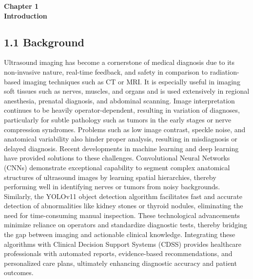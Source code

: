 \documentclass[12pt]{article}
\begin{document}
\vspace*{\fill}
\begin{center}
    {\Large \bfseries Chapter 1} \\[1em]
    {\Large \bfseries Introduction}
\end{center}
\vspace*{\fill}
\newpage %



\subsection{1.1 Background}

\vspace{10pt}

  \noindent Ultrasound imaging has become a cornerstone of medical diagnosis due to its non-invasive nature,
real-time feedback, and safety in comparison to radiation-based imaging techniques such as CT or
MRI. It is especially useful in imaging soft tissues such as nerves, muscles, and organs and is used
extensively in regional anesthesia, prenatal diagnosis, and abdominal scanning. Image interpretation continues to be heavily operator-dependent, resulting in variation of diagnoses, particularly
for subtle pathology such as tumors in the early stages or nerve compression syndromes. Problems
such as low image contrast, speckle noise, and anatomical variability also hinder proper analysis,
resulting in misdiagnosis or delayed diagnosis. Recent developments in machine learning and deep
learning have provided solutions to these challenges.
Convolutional Neural Networks (CNNs) demonstrate exceptional capability to segment complex anatomical structures of ultrasound images by learning spatial hierarchies, thereby performing well in identifying nerves or tumors from noisy backgrounds. Similarly, the YOLOv11 object
detection algorithm facilitates fast and accurate detection of abnormalities like kidney stones or
thyroid nodules, eliminating the need for time-consuming manual inspection. These technological
advancements minimize reliance on operators and standardize diagnostic tests, thereby bridging
the gap between imaging and actionable clinical knowledge. Integrating these algorithms with
Clinical Decision Support Systems (CDSS) provides healthcare professionals with automated
reports, evidence-based recommendations, and personalized care plans, ultimately enhancing diagnostic accuracy and patient outcomes.
\end{document}
